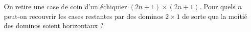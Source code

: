 On retire une case de coin d'un échiquier $(2n + 1) \times (2n + 1)$. Pour quels $n$ peut-on recouvrir les cases restantes par des dominos $2 \times 1$ de sorte que la moitié des dominos soient horizontaux ?
